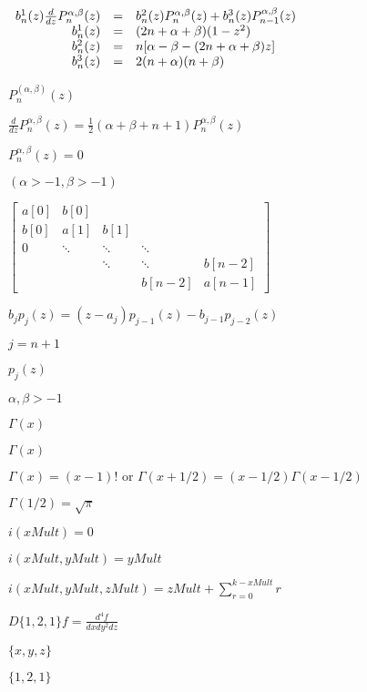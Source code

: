 \documentclass{article}
\begin{document}
$ \begin{array}{rcl}
b^1_n(z)\frac{d}{dz} P^{\alpha,\beta}_n(z)&=&b^2_n(z)P^{\alpha,\beta}_n(z)
+ b^3_n(z) P^{\alpha,\beta}_{n-1}(z) \hspace{2.2cm} \\
b^1_n(z) &=& (2n+\alpha + \beta)(1-z^2) \\
b^2_n(z) &=& n[\alpha - \beta - (2n+\alpha + \beta)z]\\
b^3_n(z) &=& 2(n+\alpha)(n+\beta)
\end{array} $
\pagebreak

$ P^(\alpha,\beta)_n(z)$
\pagebreak

$ \frac{d}{dz} P^{\alpha,\beta}_n(z)
= \frac{1}{2} (\alpha + \beta + n + 1)  P^{\alpha,\beta}_n(z) $
\pagebreak

$ P_n^{\alpha,\beta}(z) = 0 $
\pagebreak

$( \alpha > -1, \beta > -1)$
\pagebreak

$ \left [  \begin{array}{ccccc}
a[0] & b[0]   &        &        & \\
b[0] & a[1]   & b[1]   &        & \\
0   & \ddots & \ddots & \ddots &  \\
&        & \ddots & \ddots & b[n-2] \\
&        &        & b[n-2] & a[n-1] \end{array} \right ] $
\pagebreak

$  b_j p_j(z) = (z - a_j ) p_{j-1}(z) - b_{j-1}   p_{j-2}(z) $
\pagebreak

$ j=n+1$
\pagebreak

$p_j(z)$
\pagebreak

$ \alpha,\beta > -1$
\pagebreak

$ \Gamma(x)$
\pagebreak

$\Gamma(x)$
\pagebreak

$ \Gamma(x) = (x-1)!  \mbox{ or  }  \Gamma(x+1/2) = (x-1/2)\Gamma(x-1/2)$
\pagebreak

$ \Gamma(1/2) = \sqrt{\pi}$
\pagebreak

$i(xMult)            = 0$
\pagebreak

$i(xMult,yMult)      =yMult$
\pagebreak

$i(xMult,yMult,zMult)=zMult+\sum_{r = 0}^{k-xMult} r$
\pagebreak

$\displaystyle D\{1,2,1\}f = \frac{d^4 f}{dx dy^2 dz}$
\pagebreak

$\{x, y, z\}$
\pagebreak

$\{1,2,1\}$
\pagebreak
\end{document}
